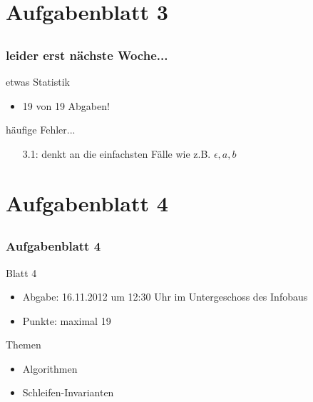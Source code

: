 \section[Blatt 3]{Aufgabenblatt 3}
\subsection*{}
\begin{frame}
	\frametitle{leider erst nächste Woche...}
	\begin{block}{etwas Statistik}
		\begin{itemize}
			\item 19 von 19 Abgaben!
		\end{itemize}
	\end{block}

	\begin{block}{häufige Fehler...}
		\begin{itemize}
			\item[3.1:] denkt an die einfachsten Fälle wie z.B. $\epsilon, a, b$
		 \end{itemize}
	\end{block}
\end{frame}

\section[Blatt 4]{Aufgabenblatt 4}
\subsection*{}
\begin{frame}
        \frametitle{Aufgabenblatt 4}
        \begin{block}{Blatt 4}
					\begin{itemize}
						\item Abgabe: 16.11.2012 um 12:30 Uhr im Untergeschoss des Infobaus
						\item Punkte: maximal 19
					\end{itemize}
        \end{block}
        \begin{block}{Themen}
        \begin{itemize}
            \item Algorithmen
          	\item Schleifen-Invarianten
        \end{itemize}
        \end{block}
\end{frame}
